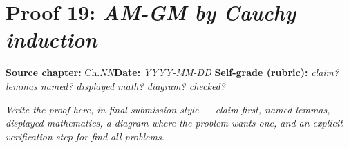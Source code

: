 \documentclass[11pt]{article}
\begin{document}
\section*{Proof 19: \emph{AM-GM by Cauchy induction}}
\textbf{Source chapter:} Ch.\emph{NN}\quad \textbf{Date:} \emph{YYYY-MM-DD}\quad
\textbf{Self-grade (rubric):} \emph{claim? lemmas named? displayed math? diagram? checked?}
\medskip

\emph{Write the proof here, in final submission style — claim first, named lemmas,
displayed mathematics, a diagram where the problem wants one, and an explicit
verification step for find-all problems.}
\end{document}
